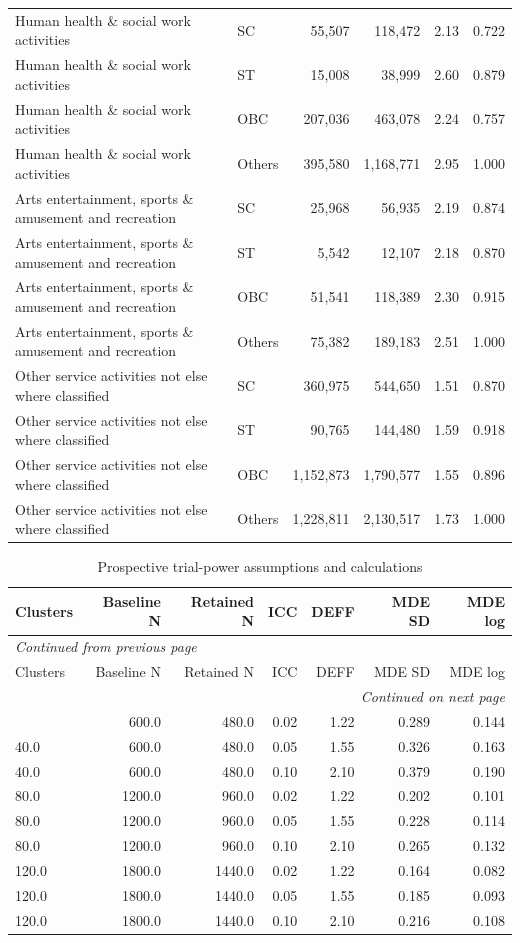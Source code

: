 \documentclass[11pt,a4paper]{report}
\begin{document}
\begin{longtable}{>{\raggedright\arraybackslash}p{5cm}lrrrr}
Human health \& social work activities & SC & 55,507 & 118,472 & 2.13 & 0.722 \\
Human health \& social work activities & ST & 15,008 & 38,999 & 2.60 & 0.879 \\
Human health \& social work activities & OBC & 207,036 & 463,078 & 2.24 & 0.757 \\
Human health \& social work activities & Others & 395,580 & 1,168,771 & 2.95 & 1.000 \\
Arts entertainment, sports \& amusement and recreation & SC & 25,968 & 56,935 & 2.19 & 0.874 \\
Arts entertainment, sports \& amusement and recreation & ST & 5,542 & 12,107 & 2.18 & 0.870 \\
Arts entertainment, sports \& amusement and recreation & OBC & 51,541 & 118,389 & 2.30 & 0.915 \\
Arts entertainment, sports \& amusement and recreation & Others & 75,382 & 189,183 & 2.51 & 1.000 \\
Other service activities not else where classified & SC & 360,975 & 544,650 & 1.51 & 0.870 \\
Other service activities not else where classified & ST & 90,765 & 144,480 & 1.59 & 0.918 \\
Other service activities not else where classified & OBC & 1,152,873 & 1,790,577 & 1.55 & 0.896 \\
Other service activities not else where classified & Others & 1,228,811 & 2,130,517 & 1.73 & 1.000 \\
\end{longtable}\endgroup
\begingroup\footnotesize\setlength{\tabcolsep}{4pt}
\begin{longtable}{lrrrrrr}
\caption{Prospective trial-power assumptions and calculations}\\\toprule
Clusters & Baseline N & Retained N & ICC & DEFF & MDE SD & MDE log \\\midrule\endfirsthead
\multicolumn{7}{l}{\textit{Continued from previous page}}\\\toprule
Clusters & Baseline N & Retained N & ICC & DEFF & MDE SD & MDE log \\\midrule\endhead
\midrule\multicolumn{7}{r}{\textit{Continued on next page}}\\\endfoot\bottomrule\endlastfoot
40.0 & 600.0 & 480.0 & 0.02 & 1.22 & 0.289 & 0.144 \\
40.0 & 600.0 & 480.0 & 0.05 & 1.55 & 0.326 & 0.163 \\
40.0 & 600.0 & 480.0 & 0.10 & 2.10 & 0.379 & 0.190 \\
80.0 & 1200.0 & 960.0 & 0.02 & 1.22 & 0.202 & 0.101 \\
80.0 & 1200.0 & 960.0 & 0.05 & 1.55 & 0.228 & 0.114 \\
80.0 & 1200.0 & 960.0 & 0.10 & 2.10 & 0.265 & 0.132 \\
120.0 & 1800.0 & 1440.0 & 0.02 & 1.22 & 0.164 & 0.082 \\
120.0 & 1800.0 & 1440.0 & 0.05 & 1.55 & 0.185 & 0.093 \\
120.0 & 1800.0 & 1440.0 & 0.10 & 2.10 & 0.216 & 0.108 \\
\end{longtable}\endgroup
\end{document}

